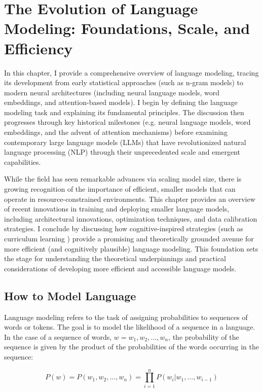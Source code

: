 \chapter{The Evolution of Language Modeling: Foundations, Scale, and Eﬀiciency}

In this chapter, I provide a comprehensive overview of language modeling, tracing its development from early statistical approaches (such as n-gram models) to modern neural architectures (including neural language models, word embeddings, and attention-based models). I begin by defining the language modeling task and explaining its fundamental principles. The discussion then progresses through key historical milestones (e.g. neural language models, word embeddings, and the advent of attention mechanisms) before examining contemporary large language models (LLMs) that have revolutionized natural language processing (NLP) through their unprecedented scale and emergent capabilities.

While the field has seen remarkable advances via scaling model size, there is growing recognition of the importance of efficient, smaller models that can operate in resource-constrained environments. This chapter provides an overview of recent innovations in training and deploying smaller language models, including architectural innovations, optimization techniques, and data calibration strategies. I conclude by discussing how cognitive-inspired strategies (such as curriculum learning ) provide a promising and theoretically grounded avenue for more efficient (and cognitively plausible) language modeling. This foundation sets the stage for understanding the theoretical underpinnings and practical considerations of developing more efficient and accessible language models.

\section{How to Model Language}
Language modeling refers to the task of assigning probabilities to sequences of words or tokens. The goal is to model the likelihood of a sequence in a language. In the case of a sequence of words, $w = w_1, w_2, \ldots, w_n$, the probability of the sequence is given by the product of the probabilities of the words occurring in the sequence:

\begin{equation}    
    P(w) = P(w_1, w_2, \ldots, w_n) = \prod_{i=1}^n P(w_i | w_1, \ldots, w_{i-1})
\end{equation}

